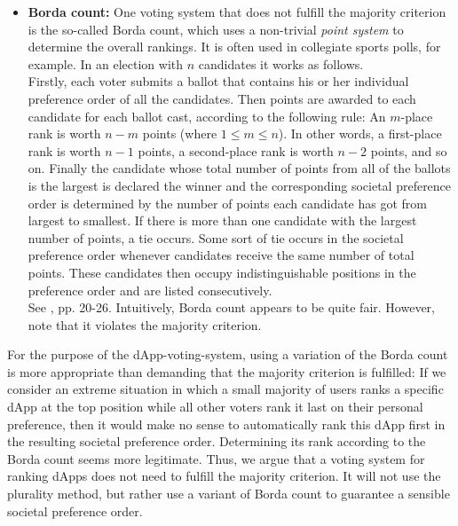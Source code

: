 \begin{itemize}[leftmargin = 0pt, nosep] 
\item \textbf{Borda count:} One voting system that does not fulfill the majority criterion is the so-called Borda count, which uses a non-trivial {\emph{point system}} to determine the overall rankings. 
It is often used in collegiate sports polls, for example. In an election with $n$ candidates it works as follows.\\
Firstly, each voter submits a ballot that contains his or her individual preference order of all the candidates.
Then points are awarded to each candidate for each ballot cast, according to the following rule: 
An $m$-place rank is worth $n-m$ points (where $1\leq{m}\leq{n}$). In other words, a first-place rank is worth $n-1$ points, a second-place rank is worth $n-2$ points, and so on.
Finally the candidate whose total number of points from all of the ballots is the largest is declared the winner and the corresponding societal preference order is determined by the number of points each candidate has got from largest to smallest. 
If there is more than one candidate with the largest number of points, a tie occurs. 
Some sort of tie occurs in the societal preference order whenever candidates receive the same number of total points. 
These candidates then occupy indistinguishable positions in the preference order and are listed consecutively.\\
See \cite{voting}, pp. 20-26. Intuitively, Borda count appears to be quite fair. However, note that it violates the majority criterion. \\
\end{itemize}
 
For the purpose of the dApp-voting-system, using a variation of the Borda count is more appropriate than demanding that the majority criterion is fulfilled: If we consider an extreme situation in which a small majority of users ranks a specific dApp at the top position while all other voters rank it last on their personal preference, then it would make no sense to automatically rank this dApp first in the resulting societal preference order. Determining its rank according to the Borda count seems more legitimate. Thus, we argue that a voting system for ranking dApps does not need to fulfill the majority criterion. It will not use the plurality method, but rather use a variant of Borda count to guarantee a sensible societal preference order. \\
 
